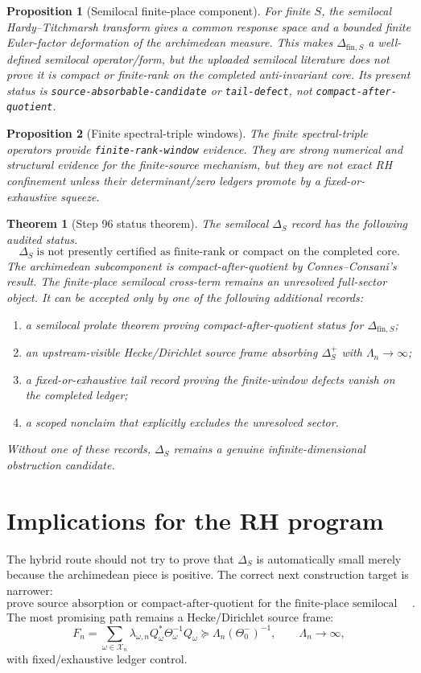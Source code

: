 \documentclass[11pt]{article}
\newtheorem{theorem}{Theorem}
\newtheorem{proposition}{Proposition}
\begin{document}
\begin{proposition}[Semilocal finite-place component]
For finite $S$, the semilocal Hardy--Titchmarsh transform gives a common response space and a bounded finite Euler-factor deformation of the archimedean measure.  This makes $\Delta_{\mathrm{fin},S}$ a well-defined semilocal operator/form, but the uploaded semilocal literature does not prove it is compact or finite-rank on the completed anti-invariant core.  Its present status is \texttt{source-absorbable-candidate} or \texttt{tail-defect}, not \texttt{compact-after-quotient}.
\end{proposition}

\begin{proposition}[Finite spectral-triple windows]
The finite spectral-triple operators provide \texttt{finite-rank-window} evidence.  They are strong numerical and structural evidence for the finite-source mechanism, but they are not exact RH confinement unless their determinant/zero ledgers promote by a fixed-or-exhaustive squeeze.
\end{proposition}

\begin{theorem}[Step 96 status theorem]
The semilocal $\Delta_S$ record has the following audited status.
\[
  \boxed{\Delta_S\;\text{is not presently certified as finite-rank or compact on the completed core}.}
\]
The archimedean subcomponent is compact-after-quotient by Connes--Consani's result.  The finite-place semilocal cross-term remains an unresolved full-sector object.  It can be accepted only by one of the following additional records:
\begin{enumerate}[label=(\alph*)]
\item a semilocal prolate theorem proving compact-after-quotient status for $\Delta_{\mathrm{fin},S}$;
\item an upstream-visible Hecke/Dirichlet source frame absorbing $\Delta_S^+$ with $\Lambda_n\to\infty$;
\item a fixed-or-exhaustive tail record proving the finite-window defects vanish on the completed ledger;
\item a scoped nonclaim that explicitly excludes the unresolved sector.
\end{enumerate}
Without one of these records, $\Delta_S$ remains a genuine infinite-dimensional obstruction candidate.
\end{theorem}

\section{Implications for the RH program}
The hybrid route should not try to prove that $\Delta_S$ is automatically small merely because the archimedean piece is positive.  The correct next construction target is narrower:
\[
  \boxed{\text{prove source absorption or compact-after-quotient for the finite-place semilocal cross-term}.}
\]
The most promising path remains a Hecke/Dirichlet source frame:
\[
  F_n = \sum_{\omega\in\mathcal X_n}\lambda_{\omega,n}Q_\omega^*\Theta_\omega^{-1}Q_\omega
  \succeq \Lambda_n(\Theta_0^-)^{-1},\qquad \Lambda_n\to\infty,
\]
with fixed/exhaustive ledger control.
\end{document}
